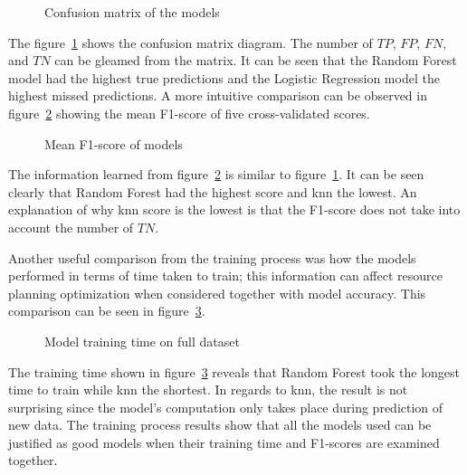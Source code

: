\begin{figure}[ht]
    \centering
    \caption{Confusion matrix of the models}
    \label{fig:conf-matrix}
\end{figure}

The figure~\ref{fig:conf-matrix} shows the confusion matrix diagram.
The number of $TP$, $FP$, $FN$, and $TN$ can be gleamed from the matrix.
It can be seen that the Random Forest model had the highest true predictions and the Logistic Regression model the highest missed predictions.
A more intuitive comparison can be observed in figure~\ref{fig:score-comparison} showing the mean F1-score of five cross-validated scores.

\begin{figure}[ht]
    \centering
    \caption{Mean F1-score of models}
    \label{fig:score-comparison}
\end{figure}


The information learned from figure~\ref{fig:score-comparison} is similar to figure~\ref{fig:conf-matrix}.
It can be seen clearly that Random Forest had the highest score and \gls{knn} the lowest.
An explanation of why \gls{knn} score is the lowest is that the F1-score does not take into account the number of $TN$.

Another useful comparison from the training process was how the models performed in terms of time taken to train;
this information can affect resource planning optimization when considered together with model accuracy.
This comparison can be seen in figure~\ref{fig:train-time}.

\begin{figure}[ht]
    \centering
    \caption{Model training time on full dataset}
    \label{fig:train-time}
\end{figure}

The training time shown in figure~\ref{fig:train-time} reveals that Random Forest took the longest time to train while
\gls{knn} the shortest.
In regards to \gls{knn}, the result is not surprising since the model's computation only takes place during prediction of new data.
The training process results show that all the models used can be justified as good models when their training time and F1-scores are examined together.


